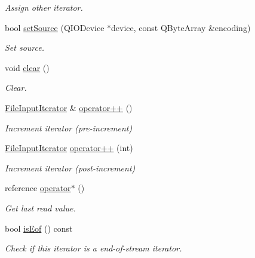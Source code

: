 \begin{DoxyCompactItemize}
\begin{DoxyCompactList}\small\item\em Assign other iterator. \end{DoxyCompactList}\item 
bool \hyperlink{struct_mdt_1_1_plain_text_1_1_file_input_iterator_a5c8774871108780cc0c746a2b37163c5}{set\+Source} (Q\+I\+O\+Device $\ast$device, const Q\+Byte\+Array \&encoding)
\begin{DoxyCompactList}\small\item\em Set source. \end{DoxyCompactList}\item 
void \hyperlink{struct_mdt_1_1_plain_text_1_1_file_input_iterator_a4197ea452aa5e75602d1a38e08baef81}{clear} ()
\begin{DoxyCompactList}\small\item\em Clear. \end{DoxyCompactList}\item 
\hyperlink{struct_mdt_1_1_plain_text_1_1_file_input_iterator}{File\+Input\+Iterator} \& \hyperlink{struct_mdt_1_1_plain_text_1_1_file_input_iterator_a0048b29d504d922ab979c22063eae21a}{operator++} ()
\begin{DoxyCompactList}\small\item\em Increment iterator (pre-\/increment) \end{DoxyCompactList}\item 
\hyperlink{struct_mdt_1_1_plain_text_1_1_file_input_iterator}{File\+Input\+Iterator} \hyperlink{struct_mdt_1_1_plain_text_1_1_file_input_iterator_a28f4e511a266f8ffcd2a5844127050d7}{operator++} (int)
\begin{DoxyCompactList}\small\item\em Increment iterator (post-\/increment) \end{DoxyCompactList}\item 
reference \hyperlink{struct_mdt_1_1_plain_text_1_1_file_input_iterator_a5c3f8149a81d8f6f059fffe188f4110b}{operator$\ast$} ()
\begin{DoxyCompactList}\small\item\em Get last read value. \end{DoxyCompactList}\item 
bool \hyperlink{struct_mdt_1_1_plain_text_1_1_file_input_iterator_a5461a2af93730a77642d56333f952704}{is\+Eof} () const 
\begin{DoxyCompactList}\small\item\em Check if this iterator is a end-\/of-\/stream iterator. \end{DoxyCompactList}\item 

\end{DoxyCompactItemize}
